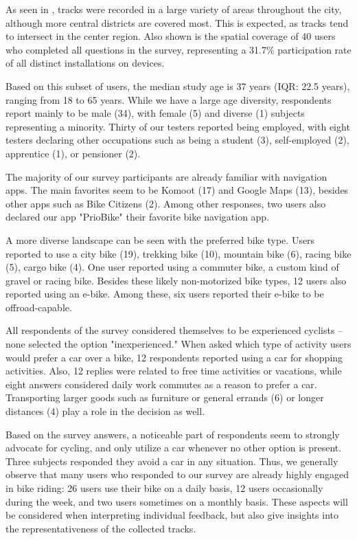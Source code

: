 As seen in , tracks were recorded in a large variety of areas throughout the city, although more central districts are covered most. This is expected, as tracks tend to intersect in the center region. Also shown is the spatial coverage of 40 users who completed all questions in the survey, representing a 31.7\% participation rate of all distinct installations on devices.

Based on this subset of users, the median study age is 37 years (IQR: 22.5 years), ranging from 18 to 65 years. While we have a large age diversity, respondents report mainly to be male (34), with female (5) and diverse (1) subjects representing a minority. Thirty of our testers reported being employed, with eight testers declaring other occupations such as being a student (3), self-employed (2), apprentice (1), or pensioner (2).

The majority of our survey participants are already familiar with navigation apps. The main favorites seem to be Komoot (17) and Google Maps (13), besides other apps such as Bike Citizens (2). Among other responses, two users also declared our app "PrioBike" their favorite bike navigation app. 

A more diverse landscape can be seen with the preferred bike type. Users reported to use a city bike (19), trekking bike (10), mountain bike (6), racing bike (5), cargo bike (4). One user reported using a commuter bike, a custom kind of gravel or racing bike. Besides these likely non-motorized bike types, 12 users also reported using an e-bike. Among these, six users reported their e-bike to be offroad-capable. 

All respondents of the survey considered themselves to be experienced cyclists -- none selected the option "inexperienced." When asked which type of activity users would prefer a car over a bike, 12 respondents reported using a car for shopping activities. Also, 12 replies were related to free time activities or vacations, while eight answers considered daily work commutes as a reason to prefer a car. Transporting larger goods such as furniture or general errands (6) or longer distances (4) play a role in the decision as well. 

Based on the survey answers, a noticeable part of respondents seem to strongly advocate for cycling, and only utilize a car whenever no other option is present. Three subjects responded they avoid a car in any situation. Thus, we generally observe that many users who responded to our survey are already highly engaged in bike riding: 26 users use their bike on a daily basis, 12 users occasionally during the week, and two users sometimes on a monthly basis. These aspects will be considered when interpreting individual feedback, but also give insights into the representativeness of the collected tracks.

